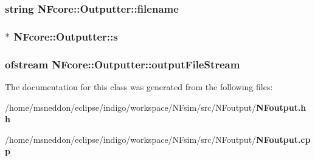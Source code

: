 \subsubsection{\setlength{\rightskip}{0pt plus 5cm}string {\bf NFcore::Outputter::filename}\hspace{0.3cm}{\tt  [protected]}}\label{classNFcore_1_1Outputter_150c6ee5c2eb1f61eaef24139c05e4ed}


\subsubsection{$\ast$ {\bf NFcore::Outputter::s}\hspace{0.3cm}{\tt  [protected]}}\label{classNFcore_1_1Outputter_c63f98e10701598bf2dc79b0c76d2447}


\subsubsection{\setlength{\rightskip}{0pt plus 5cm}ofstream {\bf NFcore::Outputter::outputFileStream}\hspace{0.3cm}{\tt  [protected]}}\label{classNFcore_1_1Outputter_01b52e6b6164df23aac52809fb4d6ae6}




The documentation for this class was generated from the following files:\begin{CompactItemize}
\item 
/home/msneddon/eclipse/indigo/workspace/NFsim/src/NFoutput/{\bf NFoutput.hh}\item 
/home/msneddon/eclipse/indigo/workspace/NFsim/src/NFoutput/{\bf NFoutput.cpp}\end{CompactItemize}
